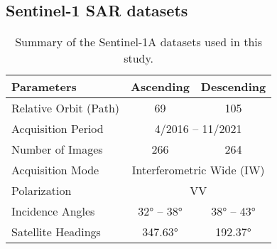 \subsection{Sentinel-1 SAR datasets}
\label{subsubsec:sentinel}

\begin{table}[H]
	\centering
	\caption{Summary of the Sentinel-1A datasets used in this study.}
	\label{tab:sentinel1_info}
	
	\begin{tabular}{lcc}
		\toprule
		\textbf{Parameters} & \textbf{Ascending} & \textbf{Descending} \\
		\midrule
		Relative Orbit (Path) & 69 & 105 \\
		\multicolumn{1}{l}{Acquisition Period} & \multicolumn{2}{c}{4/2016 – 11/2021} \\
		Number of Images      & 266 & 264 \\
		\multicolumn{1}{l}{Acquisition Mode} & \multicolumn{2}{c}{Interferometric Wide (IW)} \\
		\multicolumn{1}{l}{Polarization} & \multicolumn{2}{c}{VV} \\
		Incidence Angles & 32° – 38° & 38° – 43° \\
		Satellite Headings & 347.63° & 192.37° \\
		\bottomrule
	\end{tabular}
\end{table}




